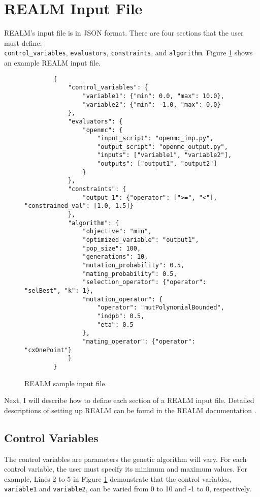\section{REALM Input File}
REALM's input file is in JSON format. 
There are four sections that the user must define: \\ \texttt{control\_variables}, 
\texttt{evaluators}, \texttt{constraints}, and \texttt{algorithm}. 
Figure \ref{fig:realm-input} shows an example REALM input file. 
\begin{figure}[]
    \begin{verbatim}
        {
            "control_variables": {
                "variable1": {"min": 0.0, "max": 10.0}, 
                "variable2": {"min": -1.0, "max": 0.0}
            }, 
            "evaluators": {
                "openmc": {
                    "input_script": "openmc_inp.py",
                    "output_script": "openmc_output.py", 
                    "inputs": ["variable1", "variable2"],
                    "outputs": ["output1", "output2"]
                }
            }, 
            "constraints": {
                "output_1": {"operator": [">=", "<"], "constrained_val": [1.0, 1.5]}
            }, 
            "algorithm": {
                "objective": "min", 
                "optimized_variable": "output1", 
                "pop_size": 100, 
                "generations": 10, 
                "mutation_probability": 0.5,
                "mating_probability": 0.5,
                "selection_operator": {"operator": "selBest", "k": 1},
                "mutation_operator": {
                    "operator": "mutPolynomialBounded",
                    "indpb": 0.5,
                    "eta": 0.5
                },
                "mating_operator": {"operator": "cxOnePoint"}
            }
        }
    \end{verbatim}
    \caption{REALM sample input file.}
    \label{fig:realm-input}
\end{figure}
Next, I will describe how to define each section of a REALM input file. 
Detailed descriptions of setting up REALM can be found in the REALM 
documentation \cite{chee_arfcrealm_2021}. 

\subsection{Control Variables}
The control variables are parameters the genetic algorithm will vary. 
For each control variable, the user must specify its minimum and maximum values.
For example, Lines 2 to 5 in Figure \ref{fig:realm-input} demonstrate that the 
control variables, \texttt{variable1} and \texttt{variable2}, 
can be varied from 0 to 10 and -1 to 0, respectively. 

